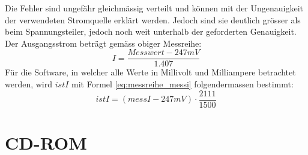 Die Fehler sind ungefähr gleichmässig verteilt und können mit der Ungenauigkeit der verwendeten Stromquelle erklärt werden. Jedoch sind sie deutlich grösser als beim Spannungsteiler, jedoch noch weit unterhalb der geforderten Genauigkeit. Der Ausgangsstrom beträgt gemäss obiger Messreihe:
\begin{equation}
	I=\frac{Messwert-247mV}{1.407}
\label{eq:messreihe_messi}
\end{equation}
Für die Software, in welcher alle Werte in Millivolt und Milliampere betrachtet werden, wird $istI$ mit Formel \ref{eq:messreihe_messi} folgendermassen bestimmt:
\begin{equation}
	istI=\left(messI-247mV\right)\cdot\frac{2111}{1500}
\label{eq:messreihe_messi_sw}
\end{equation}


\newpage
\section{CD-ROM}